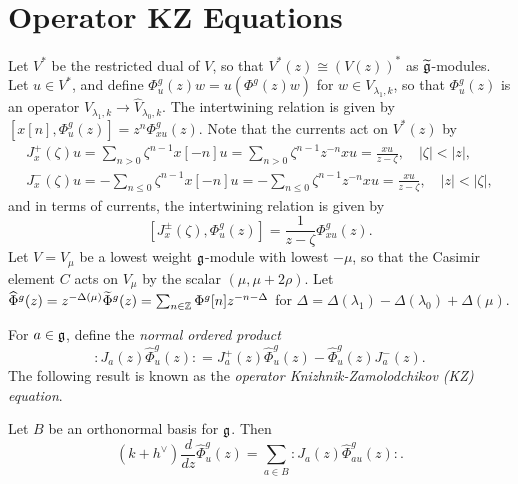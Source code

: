 \section{Operator KZ Equations}

\begin{remark}
  Let $V^*$ be the restricted dual of $V$, so that
  $V^*(z) \cong (V(z))^*$ as $\widetilde{\mathfrak{g}}$-modules.
  Let $u \in V^*$, and
  define $\Phi^g_u(z) w = u(\Phi^g(z) w)$
  for $w \in V_{\lambda_1, k}$,
  so that $\Phi^g_u(z)$ is an operator
  $V_{\lambda_1, k} \to \widehat{V}_{\lambda_0, k}$.
  The intertwining relation is given by
  $[x[n], \Phi^g_u(z)] = z^n \Phi^g_{xu}(z)$.
  Note that the currents act on $V^*(z)$ by
  \begin{gather*}
    J_x^+(\zeta) u
    = \sum_{n > 0} \zeta^{n - 1} x[-n] u
    = \sum_{n > 0} \zeta^{n - 1} z^{-n} xu
    = \frac{xu}{z - \zeta}, \quad |\zeta| < |z|, \\
    J_x^-(\zeta) u
    = - \sum_{n \le 0} \zeta^{n - 1} x[-n] u
    = - \sum_{n \le 0} \zeta^{n - 1} z^{-n} xu
    = \frac{xu}{z - \zeta}, \quad |z| < |\zeta|,
  \end{gather*}
  and in terms of currents, the intertwining
  relation is given by
  \[
    [J_x^{\pm}(\zeta), \Phi^g_{u}(z)]
    = \frac{1}{z - \zeta} \Phi^g_{xu}(z). \tag{$*$}
  \]
  Let $V = V_\mu$ be a lowest weight $\mathfrak{g}$-module
  with lowest $-\mu$, so that the Casimir element
  $C$ acts on $V_\mu$ by the scalar $(\mu, \mu + 2\rho)$.
  Let $\widehat{\Phi}^g(z) = z^{-\Delta(\mu)} \widetilde{\Phi}^g(z) = \sum_{n \in \mathbb{Z}} \Phi^g[n] z^{-n - \Delta}$
  for $\Delta = \Delta(\lambda_1) - \Delta(\lambda_0) + \Delta(\mu)$.


  For $a \in \mathfrak{g}$, define the \emph{normal ordered product}
  \[
    {:} J_a(z) \widehat{\Phi}^g_u(z) {:}
    = J_a^+(z) \widehat{\Phi}^g_u(z)
    - \widehat{\Phi}^g_u(z) J_a^-(z).
  \]
  The following result is known as the
  \emph{operator Knizhnik-Zamolodchikov (KZ) equation}.
\end{remark}

\begin{theorem}\label{thm:operator-KZ}
  Let $B$ be an orthonormal basis for $\mathfrak{g}$. Then
  \[
    (k + h^\vee) \frac{d}{dz} \widehat{\Phi}^g_u(z)
    = \sum_{a \in B} {:} J_a(z) \widehat{\Phi}^g_{au}(z) {:}.
  \]
\end{theorem}

